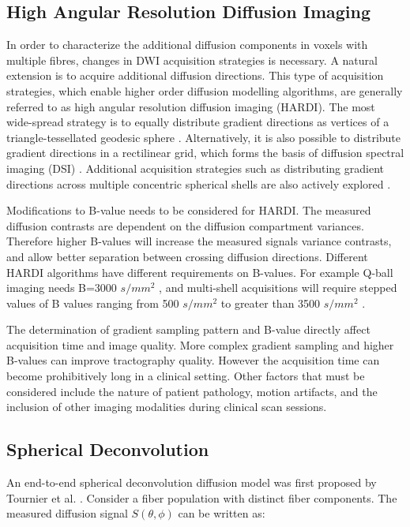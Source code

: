 \subsection{High Angular Resolution Diffusion Imaging}

In order to characterize the additional diffusion components in voxels with multiple fibres, changes in DWI acquisition strategies is necessary. A natural extension is to acquire additional diffusion directions. This type of acquisition strategies, which enable higher order diffusion modelling algorithms, are generally referred to as high angular resolution diffusion imaging (HARDI). The most wide-spread strategy is to equally distribute gradient directions as vertices of a triangle-tessellated geodesic sphere \cite{Frank2001}. Alternatively, it is also possible to distribute gradient directions in a rectilinear grid, which forms the basis of diffusion spectral imaging (DSI) \cite{Wedeen2005}. Additional acquisition strategies such as distributing gradient directions across multiple concentric spherical shells are also actively explored \cite{Jeurissen2014a}. 

Modifications to B-value needs to be considered for HARDI. The measured diffusion contrasts are dependent on the diffusion compartment variances. Therefore higher B-values will increase the measured signals variance contrasts, and allow better separation between crossing diffusion directions. Different HARDI algorithms have different requirements on B-values. For example Q-ball imaging needs B=3000 $s/mm^2$ \cite{Descoteaux2007a}, and multi-shell acquisitions will require stepped values of B values ranging from 500  $s/mm^2 $  to greater than 3500  $s/mm^2 $ \cite{Tournier2013}. 

The determination of gradient sampling pattern and B-value directly affect acquisition time and image quality. More complex gradient sampling and higher B-values can improve tractography quality. However the acquisition time can become prohibitively long in a clinical setting. Other factors that must be considered include the nature of patient pathology, motion artifacts, and the inclusion of other imaging modalities during clinical scan sessions. 

\subsection{Spherical Deconvolution}

An end-to-end spherical deconvolution diffusion model was first proposed by Tournier et al. \cite{Tournier2004}. 
Consider a fiber population with distinct fiber components. The measured diffusion signal $S(\theta,\phi)$ can be written as:

